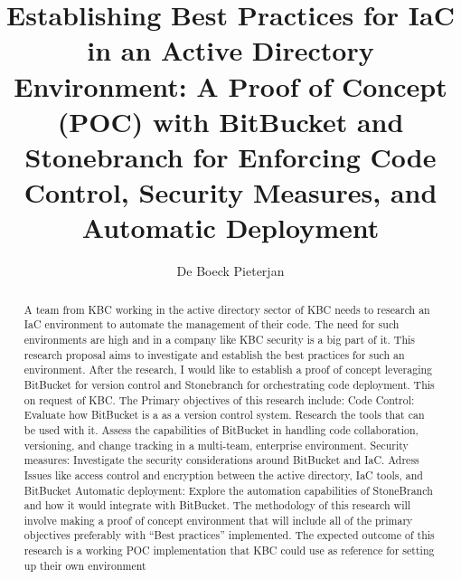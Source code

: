 \documentclass{hogent-article}
\title{Establishing Best Practices for IaC in an Active Directory Environment: A Proof of Concept (POC) with BitBucket and Stonebranch for Enforcing Code Control, Security Measures, and Automatic Deployment}
\author{De Boeck Pieterjan}
\begin{document}
\begin{abstract}
  A team from KBC working in the active directory sector of KBC needs to research an IaC environment to automate the management of their code. The need for such environments are high and in a company like KBC security is a big part of it. This research proposal aims to investigate and establish the best practices for such an environment. After the research, I would like to establish a proof of concept leveraging BitBucket for version control and Stonebranch for orchestrating code deployment. This on request of KBC.
  The Primary objectives of this research include:
  Code Control: Evaluate how BitBucket is a as a version control system. Research the tools that can be used with it. Assess the capabilities of BitBucket in handling code collaboration, versioning, and change tracking in a multi-team, enterprise environment.
  Security measures: Investigate the security considerations around BitBucket and IaC. Adress Issues like access control and encryption between the active directory, IaC tools, and BitBucket
  Automatic deployment: Explore the automation capabilities of StoneBranch and how it would integrate with BitBucket. 
  The methodology of this research will involve making a proof of concept environment that will include all of the primary objectives preferably with “Best practices” implemented.
  The expected outcome of this research is a working POC implementation that KBC could use as reference for setting up their own environment
  \end{abstract}

\tableofcontents



\printbibliography[heading=bibintoc]
\end{document}
